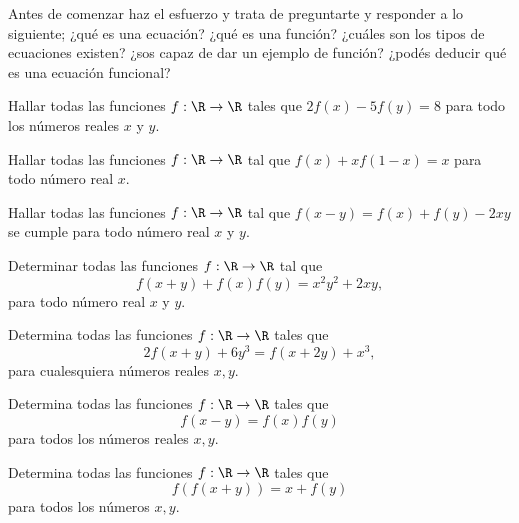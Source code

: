Antes de comenzar haz el esfuerzo y trata de preguntarte y responder a lo siguiente;
¿qué es una ecuación?
¿qué es una función?
¿cuáles son los tipos de ecuaciones existen?
¿sos capaz de dar un ejemplo de función?
¿podés deducir qué es una ecuación funcional?

\begin{exercise}
    Hallar todas las funciones $f : \R \to \R$ tales que $2f(x) - 5f(y) = 8$ para todo los números reales $x$ y $y$.
\end{exercise}

\begin{exercise}
    Hallar todas las funciones $f : \R \to \R$ tal que $f(x) + xf(1 - x) = x$ para todo número real $x$.
\end{exercise}

\begin{exercise}
    Hallar todas las funciones $f : \R \to \R$ tal que $f(x - y) = f(x) + f(y) - 2xy$ se cumple para todo número real $x$ y $y$.
\end{exercise}

\begin{exercise}
    Determinar todas las funciones $f : \R \to \R$ tal que
    \[
        f(x + y) + f(x)f(y) = x^2 y^2 + 2xy,
    \]
    para todo número real $x$ y $y$.
\end{exercise}

\begin{exercise}
    Determina todas las funciones $f : \R \to \R$ tales que
    \[
        2f(x + y) + 6y^3 = f(x + 2y) + x^3,
    \]
    para cualesquiera números reales $x,y$.
\end{exercise}

\begin{exercise}
    Determina todas las funciones $f : \R \to \R$ tales que
    \[
        f(x - y) = f(x)f(y)
    \]
    para todos los números reales $x,y$.
\end{exercise}

\begin{exercise}
    Determina todas las funciones $f : \R \to \R$ tales que
    \[
        f(f(x + y)) = x + f(y)
    \]
    para todos los números $x,y$.
\end{exercise}